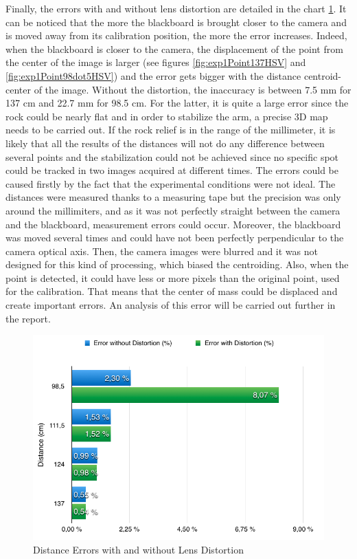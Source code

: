 Finally, the errors with and without lens distortion are detailed in the chart \ref{chart1Point}. It can be noticed that the more the blackboard is brought closer to the camera and is moved away from its calibration position, the more the error increases. Indeed, when the blackboard is closer to the camera, the displacement of the point from the center of the image is larger (see figures \ref{fig:exp1Point137HSV} and \ref{fig:exp1Point98dot5HSV}) and the error gets bigger with the distance centroid-center of the image. Without the distortion, the inaccuracy is between 7.5 mm for 137 cm and 22.7 mm for 98.5 cm. For the latter, it is quite a large error since the rock could be nearly flat and in order to stabilize the arm, a precise 3D map needs to be carried out. If the rock relief is in the range of the millimeter, it is likely that all the results of the distances will not do any difference between several points and the stabilization could not be achieved since no specific spot could be tracked in two images acquired at different times. The errors could be caused firstly by the fact that the experimental conditions were not ideal. The distances were measured thanks to a measuring tape but the precision was only around the millimiters, and as it was not perfectly straight between the camera and the blackboard, measurement errors could occur. Moreover, the blackboard was moved several times and could have not been perfectly perpendicular to the camera optical axis. Then, the camera images were blurred and it was not designed for this kind of processing, which biased the centroiding. Also, when the point is detected, it could have less or more pixels than the original point, used for the calibration. That means that the center of mass could be displaced and create important errors. An analysis of this error will be carried out further in the report.

\begin{figure}[!h] 
\centering
  \includegraphics[scale=0.5]{fig/chart1Point.png}
\caption{Distance Errors with and without Lens Distortion} 
\label{chart1Point}
\end{figure}

